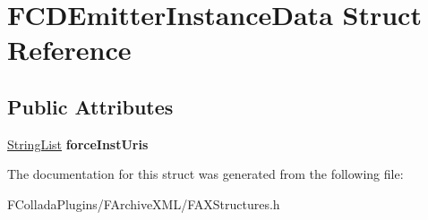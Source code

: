 \hypertarget{structFCDEmitterInstanceData}{
\section{FCDEmitterInstanceData Struct Reference}
\label{structFCDEmitterInstanceData}
}
\subsection*{Public Attributes}
\begin{DoxyCompactItemize}
\item 
\hypertarget{structFCDEmitterInstanceData_a769508e2753d8ef69301ba416e00bb41}{
\hyperlink{classfm_1_1vector}{StringList} {\bfseries forceInstUris}}
\label{structFCDEmitterInstanceData_a769508e2753d8ef69301ba416e00bb41}

\end{DoxyCompactItemize}


The documentation for this struct was generated from the following file:\begin{DoxyCompactItemize}
\item 
FColladaPlugins/FArchiveXML/FAXStructures.h\end{DoxyCompactItemize}
